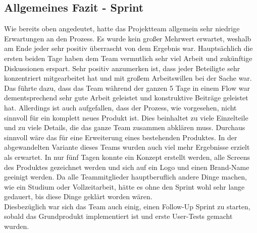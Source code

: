 \subsection{Allgemeines Fazit - Sprint}
Wie bereits oben angedeutet, hatte das Projektteam allgemein sehr niedrige Erwartungen an den Prozess. Es wurde kein großer Mehrwert erwartet, weshalb am Ende jeder sehr positiv überrascht von dem Ergebnis war. Hauptsächlich die ersten beiden Tage haben dem Team vermutlich sehr viel Arbeit und zukünftige Diskussionen erspart. Sehr positiv anzumerken ist, dass jeder Beteiligte sehr konzentriert mitgearbeitet hat und mit großem Arbeitswillen bei der Sache war. Das führte dazu, dass das Team während der ganzen 5 Tage in einem Flow war dementsprechend sehr gute Arbeit geleistet und konstruktive Beiträge geleistet hat. Allerdings ist auch aufgefallen, dass der Prozess, wie vorgesehen, nicht sinnvoll für ein komplett neues Produkt ist. Dies beinhaltet zu viele Einzelteile und zu viele Details, die das ganze Team zusammen abklären muss. Durchaus sinnvoll wäre das für eine Erweiterung eines bestehenden Produktes. In der abgewandelten Variante dieses Teams wurden auch viel mehr Ergebnisse erzielt als erwartet. In nur fünf Tagen konnte ein Konzept erstellt werden, alle Screens des Produktes gezeichnet werden und sich auf ein Logo und einen Brand-Name geeinigt werden. Da alle Teammitglieder hauptberuflich andere Dinge machen, wie ein Studium oder Vollzeitarbeit, hätte es ohne den Sprint wohl sehr lange gedauert, bis diese Dinge geklärt worden wären. \\
Diesbezüglich war sich das Team auch einig, einen Follow-Up Sprint zu starten, sobald das Grundprodukt implementiert ist und erste User-Tests gemacht wurden. 